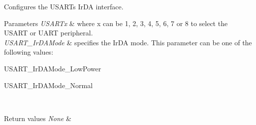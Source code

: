 Configures the U\+S\+A\+RT\textquotesingle{}s Ir\+DA interface. 


\begin{DoxyParams}{Parameters}
{\em U\+S\+A\+R\+Tx} & where x can be 1, 2, 3, 4, 5, 6, 7 or 8 to select the U\+S\+A\+RT or U\+A\+RT peripheral. \\
\hline
{\em U\+S\+A\+R\+T\+\_\+\+Ir\+D\+A\+Mode} & specifies the Ir\+DA mode. This parameter can be one of the following values\+: \begin{DoxyItemize}
\item U\+S\+A\+R\+T\+\_\+\+Ir\+D\+A\+Mode\+\_\+\+Low\+Power \item U\+S\+A\+R\+T\+\_\+\+Ir\+D\+A\+Mode\+\_\+\+Normal \end{DoxyItemize}
\\
\hline
\end{DoxyParams}

\begin{DoxyRetVals}{Return values}
{\em None} & \\
\hline
\end{DoxyRetVals}
